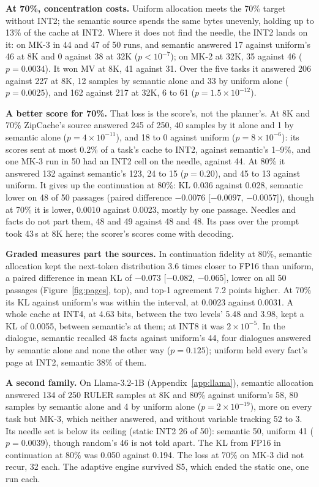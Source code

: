 \documentclass{article}
\begin{document}
\textbf{At 70\%, concentration costs.} Uniform allocation meets the 70\% target
without INT2; the semantic source spends the same bytes unevenly,
holding up to 13\% of the cache at INT2. Where it does not find the needle,
the INT2 lands on it: on MK-3 in 44 and 47 of 50 runs, and semantic answered
17 against uniform's 46 at 8K and 0 against 38 at 32K ($p < 10^{-7}$); on MK-2
at 32K, 35 against 46 ($p = 0.0034$). It won MV at 8K, 41 against 31. Over the
five tasks it answered 206 against 227 at 8K, 12 samples by semantic alone and 33
by uniform alone ($p = 0.0025$), and 162 against 217 at 32K, 6 to 61 ($p = 1.5
\times 10^{-12}$).

\textbf{A better score for 70\%.} That loss is the score's, not the planner's.
At 8K and 70\% ZipCache's source answered 245 of 250, 40 samples by it alone and 1
by semantic alone ($p = 4 \times 10^{-11}$), and 18 to 0 against uniform
($p = 8 \times 10^{-6}$): its scores sent at most 0.2\% of a task's cache to
INT2, against semantic's 1--9\%, and one MK-3 run in 50 had an INT2 cell on the
needle, against 44. At 80\% it answered 132 against semantic's 123, 24 to 15
($p = 0.20$), and 45 to 13 against uniform. It gives up the continuation at 80\%:
KL 0.036 against 0.028, semantic lower on 48 of 50 passages (paired difference
$-0.0076$ [$-0.0097$, $-0.0057$]), though at 70\% it is lower, 0.0010 against
0.0023, mostly by one passage. Needles and facts do not part them, 48 and 49 against 48 and 48. Its
pass over the prompt took 43\,s at 8K here; the scorer's scores come with decoding.

\textbf{Graded measures part the sources.} In continuation fidelity at 80\%,
semantic allocation kept the next-token distribution 3.6 times closer to FP16
than uniform, a paired difference in mean KL of $-0.073$ [$-0.082$,
$-0.065$], lower on all 50 passages (Figure~\ref{fig:pages}, top), and top-1
agreement 7.2 points higher.
At 70\% its KL against uniform's was within the interval, at 0.0023 against
0.0031. A whole cache at INT4, at 4.63 bits, between the two levels' 5.48 and
3.98, kept a KL of 0.0055, between semantic's at them; at INT8 it was
$2 \times 10^{-5}$. In the dialogue, semantic recalled 48 facts against uniform's 44, four
dialogues answered by semantic alone and none the other way ($p = 0.125$);
uniform held every fact's page at INT2, semantic 38\% of them.

\textbf{A second family.} On Llama-3.2-1B (Appendix~\ref{app:llama}), semantic
allocation answered 134 of 250 RULER samples at 8K and 80\% against uniform's 58,
80 samples by semantic alone and 4 by uniform alone ($p = 2 \times 10^{-19}$),
more on every task but MK-3, which neither answered, and without variable
tracking 52 to 3. Its needle set is below its ceiling (static INT2 26 of 50):
semantic 50, uniform 41 ($p = 0.0039$), though random's 46 is not told apart. The
KL from FP16 in continuation at 80\% was 0.050 against 0.194. The loss at 70\% on
MK-3 did not recur, 32 each. The adaptive engine survived S5, which ended the
static one, one run each.
\end{document}
